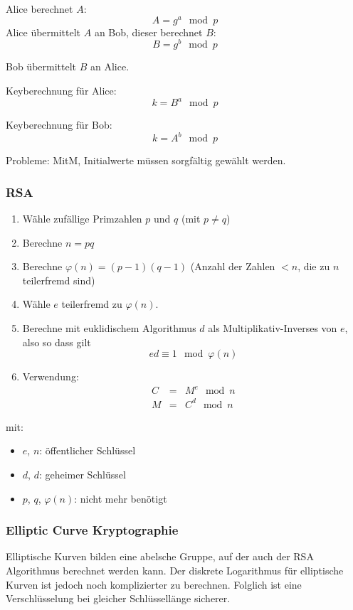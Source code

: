 Alice berechnet $A$:
\begin{equation*}
    A = g^a \mod p
\end{equation*}
Alice übermittelt $A$ an Bob, dieser berechnet $B$:
\begin{equation*}
    B = g^b \mod p
\end{equation*}

Bob übermittelt $B$ an Alice.

Keyberechnung für Alice:
\begin{equation*}
    k = B^a \mod p
\end{equation*}

Keyberechnung für Bob:
\begin{equation*}
    k = A^b \mod p
\end{equation*}

Probleme: MitM, Initialwerte müssen sorgfältig gewählt werden.

\subsubsection{RSA}
\begin{enumerate}
    \item Wähle zufällige Primzahlen $p$ und $q$ (mit $p \neq q$)
    \item Berechne $n = pq$
    \item Berechne $\varphi(n) = (p-1)(q-1)$ (Anzahl der Zahlen $<n$, die zu $n$ teilerfremd sind)
    \item Wähle $e$ teilerfremd zu $\varphi(n)$.
    \item Berechne mit euklidischem Algorithmus $d$ als Multiplikativ-Inverses von $e$, also so dass gilt
        \begin{equation*}
            e d \equiv 1 \mod \varphi(n)
        \end{equation*}
    \item Verwendung:
        \begin{eqnarray*}
            C &=& M^e \mod n \\
            M &=& C^d \mod n
        \end{eqnarray*}
\end{enumerate}
mit:
\begin{itemize}
    \item $e$, $n$: öffentlicher Schlüssel
    \item $d$, $d$: geheimer Schlüssel
    \item $p$, $q$, $\varphi(n)$: nicht mehr benötigt
\end{itemize}

\subsubsection{Elliptic Curve Kryptographie}
Elliptische Kurven bilden eine abelsche Gruppe, auf der auch der RSA Algorithmus berechnet werden kann. Der diskrete Logarithmus für elliptische Kurven ist jedoch noch komplizierter zu berechnen. Folglich ist eine Verschlüsselung bei gleicher Schlüssellänge sicherer.
